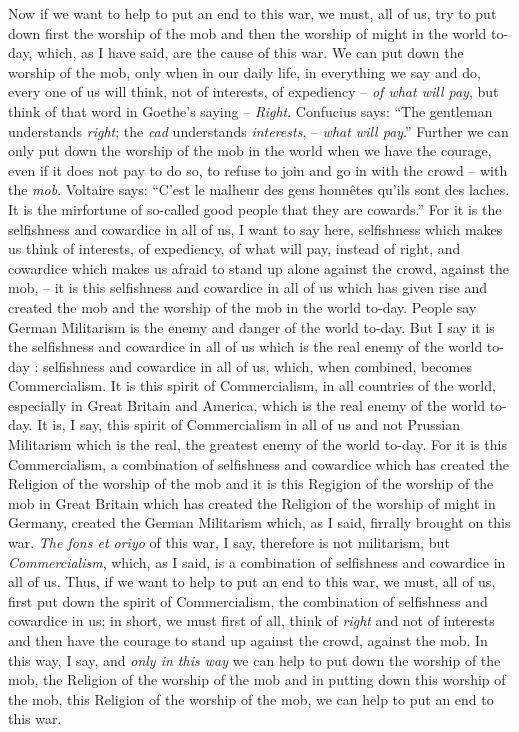 Now if we want to help to put an end to this war,
we must, all of us, try to put down first the 
worship of the mob and then the worship of might 
in the world to-day, which, as I have said, are the 
cause of this war. We can put down the worship of 
the mob, only when in our daily life, in everything 
we say and do, every one of us will think, not of 
interests, of expediency -- \emph{of what will pay}, but think 
of that word in Goethe's saying -- \emph{Right}. Confucius 
says: ``The gentleman understands \emph{right}; the \emph{cad}
understands \emph{interests}, -- \emph{what will pay}.''
Further we can only put down the worship of the mob in the world 
when we have the courage, even if it does not pay to 
do so, to refuse to join and go in with the crowd -- with 
the \emph{mob}. Voltaire says: ``C'est le malheur des gens 
honn\^etes qu'ils sont des laches.
It is the mirfortune of so-called good people that they are cowards.''
For it is the selfishness and cowardice in all of us,
I want to say here, selfishness which makes us think of 
interests, of expediency, of what will pay, instead of 
right, and cowardice which makes us afraid to stand 
up alone against the crowd, against the mob,
-- it is this selfishness and cowardice in all of us which has given 
rise and created the mob and the worship of the mob 
in the world to-day. People say German Militarism 
is the enemy and danger of the world to-day.
But I say it is the selfishness and cowardice in all of us 
which is the real enemy of the world to-day : selfishness 
and cowardice in all of us, which, when combined, 
becomes Commercialism.
It is this spirit of Commercialism, in all countries of the world,
especially in Great Britain and America,
which is 
the real enemy of the world to-day.
It is, I say, this spirit of Commercialism in all of us and not 
Prussian Militarism which is the real, the greatest 
enemy of the world to-day. For it is this Commercialism, 
a combination of selfishness and cowardice which has 
created the Religion of the worship of the mob 
and it is this Regigion of the worship of the mob 
in Great Britain which has created the Religion 
of the worship of might in Germany, created the 
German Militarism which, as I said, firrally brought 
on this war. \emph{The fons et oriyo} of this war, I say, 
therefore is not militarism, but \emph{Commercialism}, which, 
as I said, is a combination of selfishness and 
cowardice in all of us.
Thus, if we want to help to put an end to this war,
we must, all of us, first put down the spirit of Commercialism,
the combination of selfishness and cowardice in us;
in short, we must first of all, think of \emph{right} and not of interests and 
then have the courage to stand up against the crowd, 
against the mob.
In this way, I say, and \emph{only in this way} we can help to put down the worship of 
the mob, the Religion of the worship of the mob and 
in putting down this worship of the mob, this 
Religion of the worship of the mob, we can help to 
put an end to this war. 


